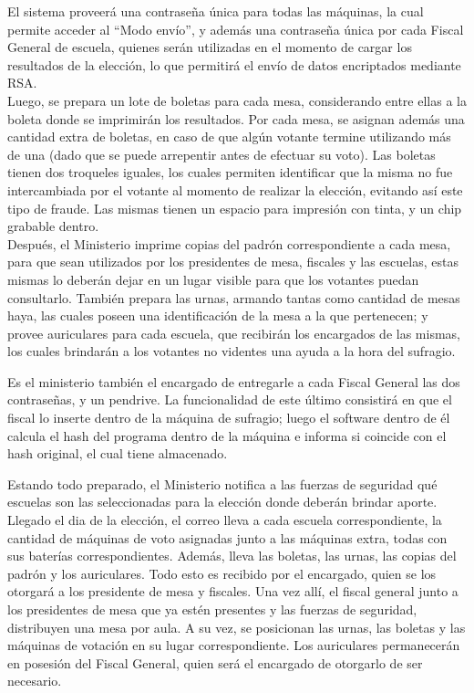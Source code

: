 El sistema proveerá una contraseña única para todas las máquinas, la cual permite acceder al “Modo envío”, y adem\'as una contraseña única por cada Fiscal General de escuela, quienes ser\'an utilizadas en el momento de cargar los resultados de la elección, lo que permitir\'a el env\'io de datos encriptados mediante RSA.\\

Luego, se prepara un lote de boletas para cada mesa, considerando entre ellas a la boleta donde se imprimirán los resultados. Por cada mesa, se asignan además una cantidad extra de boletas, en caso de que algún votante termine utilizando más de una (dado que se puede arrepentir antes de efectuar su voto). Las boletas tienen dos troqueles iguales, los cuales permiten identificar que la misma no fue intercambiada por el votante al momento de realizar la elección, evitando así este tipo de fraude. Las mismas tienen un espacio para impresión con tinta, y un chip grabable dentro.\\

Después, el Ministerio imprime copias del padrón correspondiente a cada mesa, para que sean utilizados por los presidentes de mesa, fiscales y las escuelas, estas mismas lo deberán dejar en un lugar visible para que los votantes puedan consultarlo. También prepara las urnas, armando tantas como cantidad de mesas haya, las cuales poseen una identificación de la mesa a la que pertenecen; y provee auriculares para cada escuela, que recibirán los encargados de las mismas, los cuales brindarán a los votantes no videntes una ayuda a la hora del sufragio. 

Es el ministerio también el encargado de entregarle a cada Fiscal General las dos contraseñas, y un pendrive. La funcionalidad de este \'ultimo consistir\'a en que el fiscal lo inserte dentro de la m\'aquina de sufragio; luego el software dentro de \'el calcula el hash del programa dentro de la m\'aquina e informa si coincide con el hash original, el cual tiene almacenado.

Estando todo preparado, el Ministerio notifica a las fuerzas de seguridad qu\'e escuelas son las seleccionadas para la elección donde deberán brindar aporte.\\

Llegado el dia de la elección, el correo lleva a cada escuela correspondiente, la cantidad de máquinas de voto asignadas junto a las máquinas extra, todas con sus baterías correspondientes. Además, lleva las boletas, las urnas, las copias del padrón y los auriculares. Todo esto es recibido por el encargado, quien se los otorgará a los presidente de mesa y fiscales. Una vez allí, el fiscal general junto a los presidentes de mesa que ya estén presentes y las fuerzas de seguridad, distribuyen una mesa por aula. A su vez, se posicionan las urnas, las boletas y las máquinas de votación en su lugar correspondiente. Los auriculares permanecerán en posesión del Fiscal General, quien será el encargado de otorgarlo de ser necesario.\\

